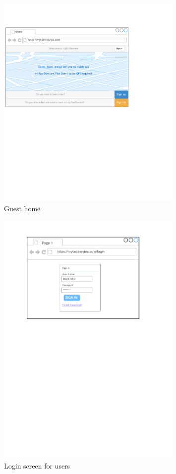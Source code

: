 \begin{figure}
\centering
\includegraphics[width=0.8\textwidth]{mockup/web/GuestHome}
\caption{Guest home}
\label{fig:mockup-guesthome}
\end{figure}

\begin{figure}
\centering
\includegraphics[width=0.8\textwidth]{mockup/web/Login_browser}
\caption{Login screen for users}
\label{fig:mockup-login-browser}
\end{figure}

